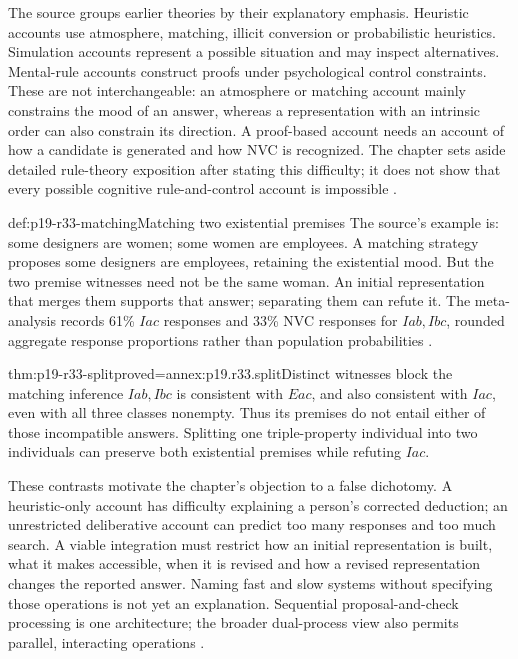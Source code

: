 The source groups earlier theories by their explanatory emphasis. Heuristic
accounts use atmosphere, matching, illicit conversion or probabilistic
heuristics. Simulation accounts represent a possible situation and may
inspect alternatives. Mental-rule accounts construct proofs under
psychological control constraints. These are not interchangeable: an
atmosphere or matching account mainly constrains the mood of an answer,
whereas a representation with an intrinsic order can also constrain its
direction. A proof-based account needs an account of how a candidate is
generated and how NVC is recognized. The chapter sets aside detailed
rule-theory exposition after stating this difficulty; it does not show
that every possible cognitive rule-and-control account is impossible
\cite[pp.~228--229]{Khemlani2021Syllogistic}.

\begin{hbexample}{def:p19-r33-matching}{Matching two existential premises}
The source's example is: some designers are women; some women are employees.
A matching strategy proposes some designers are employees, retaining the
existential mood. But the two premise witnesses need not be the same
woman. An initial representation that merges them supports that answer;
separating them can refute it. The meta-analysis records 61\% \(Iac\)
responses and 33\% NVC responses for \(Iab,Ibc\), rounded aggregate
response proportions rather than population probabilities
\cite[Table~6, p.~22 of the advance-online text]
{KhemlaniJohnsonLaird2012SyllogismMeta}.
\end{hbexample}

\begin{hblemma}{thm:p19-r33-split}{proved=annex:p19.r33.split}{Distinct witnesses block the matching inference}
\(Iab,Ibc\) is consistent with \(Eac\), and also consistent
with \(Iac\), even with all three classes nonempty.
Thus its premises do not entail either of those incompatible answers.
Splitting one triple-property individual into two individuals can preserve
both existential premises while refuting \(Iac\).
\end{hblemma}

These contrasts motivate the chapter's objection to a false dichotomy.
A heuristic-only account has difficulty explaining a person's corrected
deduction; an unrestricted deliberative account can predict too many
responses and too much search. A viable integration must restrict how an
initial representation is built, what it makes accessible, when it is
revised and how a revised representation changes the reported answer.
Naming fast and slow systems without specifying those operations is not
yet an explanation. Sequential proposal-and-check processing is one
architecture; the broader dual-process view also permits parallel,
interacting operations \cite[pp.~229--230]{Khemlani2021Syllogistic}.

